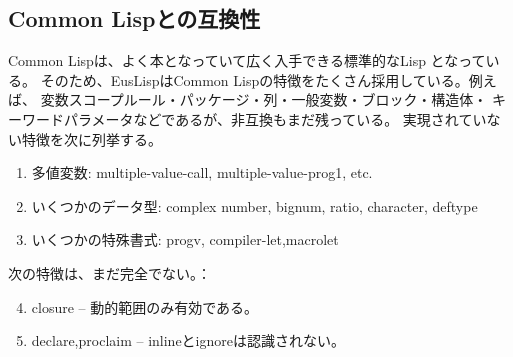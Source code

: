 \subsection{Common Lispとの互換性}

Common Lispは、よく本となっていて広く入手できる標準的なLisp\cite{CLtL,CLtL2}
となっている。
そのため、EusLispはCommon Lispの特徴をたくさん採用している。例えば、
変数スコープルール・パッケージ・列・一般変数・ブロック・構造体・
キーワードパラメータなどであるが、非互換もまだ残っている。
実現されていない特徴を次に列挙する。

\begin{enumerate}
\item 多値変数:
      multiple-value-call, multiple-value-prog1, etc.
\item いくつかのデータ型:
      complex number, bignum, ratio, character, deftype
\item いくつかの特殊書式:
      progv, compiler-let,macrolet
\end{enumerate}

次の特徴は、まだ完全でない。：
\begin{enumerate}
\setcounter{enumi}{3}
\item  closure -- 動的範囲のみ有効である。
\item  declare,proclaim -- inlineとignoreは認識されない。
\end{enumerate}

